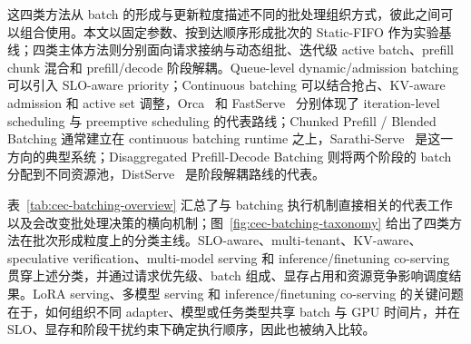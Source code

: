 这四类方法从 batch 的形成与更新粒度描述不同的批处理组织方式，彼此之间可以组合使用。本文以固定参数、按到达顺序形成批次的 Static-FIFO 作为实验基线；四类主体方法则分别面向请求接纳与动态组批、迭代级 active batch、prefill chunk 混合和 prefill/decode 阶段解耦。Queue-level dynamic/admission batching 可以引入 SLO-aware priority；Continuous batching 可以结合抢占、KV-aware admission 和 active set 调整，Orca~\cite{yu2022orca} 和 FastServe~\cite{wu2026fastserve} 分别体现了 iteration-level scheduling 与 preemptive scheduling 的代表路线；Chunked Prefill / Blended Batching 通常建立在 continuous batching runtime 之上，Sarathi-Serve~\cite{agrawal2024taming} 是这一方向的典型系统；Disaggregated Prefill-Decode Batching 则将两个阶段的 batch 分配到不同资源池，DistServe~\cite{zhong2024distserve} 是阶段解耦路线的代表。

表~\ref{tab:cec-batching-overview} 汇总了与 batching 执行机制直接相关的代表工作以及会改变批处理决策的横向机制；图~\ref{fig:cec-batching-taxonomy} 给出了四类方法在批次形成粒度上的分类主线。SLO-aware、multi-tenant、KV-aware、speculative verification、multi-model serving 和 inference/finetuning co-serving 贯穿上述分类，并通过请求优先级、batch 组成、显存占用和资源竞争影响调度结果。LoRA serving、多模型 serving 和 inference/finetuning co-serving 的关键问题在于，如何组织不同 adapter、模型或任务类型共享 batch 与 GPU 时间片，并在 SLO、显存和阶段干扰约束下确定执行顺序，因此也被纳入比较。

